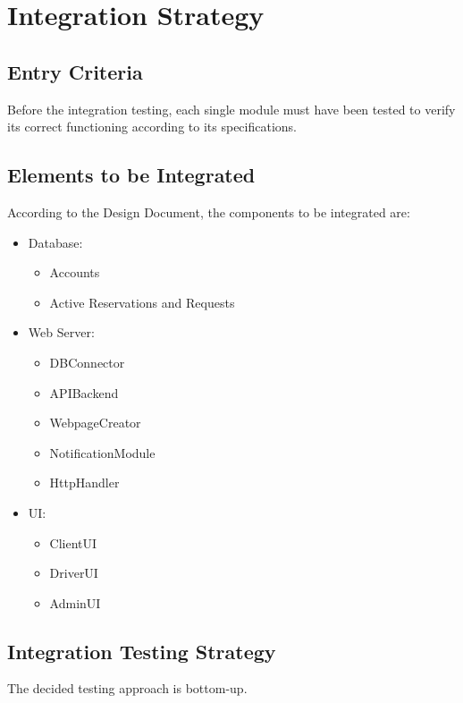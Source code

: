 \documentclass{article}
\begin{document}
\section{Integration Strategy}
\subsection{Entry Criteria}
Before the integration testing, each single module must have been tested to verify its correct functioning according to its specifications.
\subsection{Elements to be Integrated}
According to the Design Document, the components to be integrated are:
\begin{itemize}
	\item Database: 
	\begin{itemize}
		\item Accounts
		\item Active Reservations and Requests
	\end{itemize}
	\item Web Server: 
	\begin{itemize}
		\item DBConnector
		\item APIBackend
		\item WebpageCreator
		\item NotificationModule
		\item HttpHandler
	\end{itemize}
	\item UI: 
	\begin{itemize}
		\item ClientUI
		\item DriverUI
		\item AdminUI
	\end{itemize}
\end{itemize}
\subsection{Integration Testing Strategy}
The decided testing approach is bottom-up. %
\end{document}
